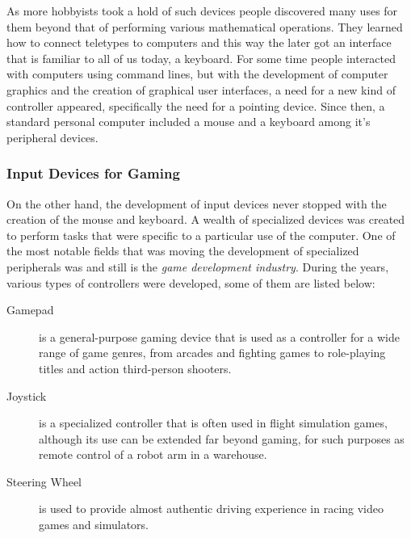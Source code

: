 
As more hobbyists took a hold of such devices people discovered many uses for
them beyond that of performing various mathematical operations. They learned
how to connect teletypes to computers and this way the later got an interface
that is familiar to all of us today, a keyboard. For some time people
interacted with computers using command lines, but with the development of
computer graphics and the creation of graphical user interfaces, a need for a
new kind of controller appeared, specifically the need for a pointing device.
Since then, a standard personal computer included a mouse and a keyboard among
it's peripheral devices.

\subsubsection{Input Devices for Gaming}

On the other hand, the development of input devices never stopped with the
creation of the mouse and keyboard. A wealth of specialized devices was
created to perform tasks that were specific to a particular use of the
computer. One of the most notable fields that was moving the development of
specialized peripherals was and still is the \emph{game development industry}.
During the years, various types of controllers were developed, some of them
are listed below:

\begin{description}

	\item [Gamepad] is a general-purpose gaming device that is used as a
		controller for a wide range of game genres, from arcades and fighting
		games to role-playing titles and action third-person shooters.

	\item [Joystick] is a specialized controller that is often used in flight
		simulation games, although its use can be extended far beyond gaming, for such
		purposes as remote control of a robot arm in a warehouse.

	\item [Steering Wheel] is used to provide almost authentic driving
		experience in racing video games and simulators. \end{description}



